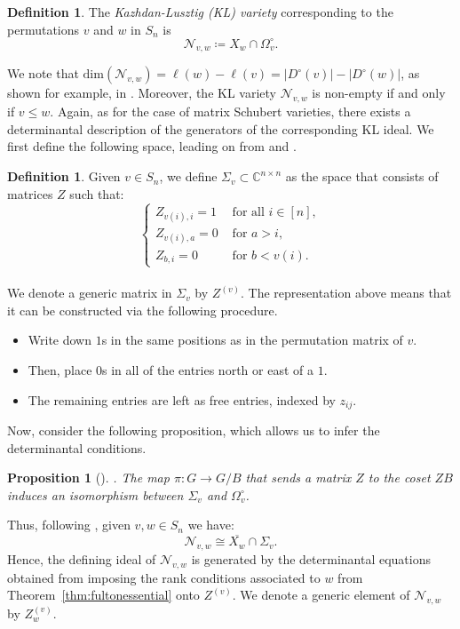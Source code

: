 \documentclass[11pt]{amsart}
\newtheorem{proposition}[theorem]{Proposition}
\theoremstyle{definition}
\theoremstyle{definition}
\newtheorem{definition}[theorem]{Definition}
\theoremstyle{definition}
\theoremstyle{definition}
\newcommand{\Xw}{\overline{X_w}}
\newcommand{\Nvw}{\mathcal{N}_{v,w}}
\newcommand{\Dc}{D^{\circ}}
\newcommand{\Zg}{Z^{(v)}_w}
\begin{document}
\begin{definition}
    The \textit{Kazhdan-Lusztig (KL) variety} corresponding to the permutations $v$ and $w$ in $S_n$ is
    $$\mathcal{N}_{v,w} \coloneqq X_w \cap \Omega_v^\circ.$$
\end{definition}
\noindent We note that $\mathrm{dim}(\Nvw) = \ell(w)-\ell(v) = |\Dc(v)| - |\Dc(w)| $, as shown for example, in \cite[Cor 3.3]{woo2008governing}. Moreover, the KL variety $\Nvw$ is non-empty if and only if $v\leq w$. Again, as for the case of matrix Schubert varieties, there exists a determinantal description of the generators of the corresponding KL ideal. We first define the following space, leading on from \cite{woo2008governing} and \cite{woo2012grobner}. 
\begin{definition}
    Given $v\in S_n$, we define $\Sigma_v\subset\mathbb{C}^{n\times n}$ as the space that consists of matrices $Z$ such that:
   $$ \begin{cases}
        Z_{v(i),i} = 1 & \text{ for all } i \in [n],\\
        Z_{v(i),a} = 0 & \text{ for } a > i,\\
        Z_{b,i} = 0 & \text{ for } b<v(i).
    \end{cases}$$\\
    We denote a generic matrix in $\Sigma_v$ by $Z^{(v)}$. The representation above means that it can be constructed via the following procedure.
    \begin{itemize}
        \item Write down $1$s in the same positions as in the permutation matrix of $v$.
        \item Then, place $0$s in all of the entries north or east of a $1$.
        \item The remaining entries are left as free entries, indexed by $z_{ij}$.
    \end{itemize}
\end{definition}

\noindent Now, consider the following proposition, which allows us to infer the determinantal conditions.
\begin{proposition}[{\cite[Chapter~10]{fulton1997algebraic}}]. The map $\pi: G \rightarrow G/B$ that sends a matrix $Z$ to the coset $ZB$ induces an isomorphism between $\Sigma_v$ and $\Omega^\circ_v$.
\end{proposition}
\noindent
Thus, following \cite{woo2008governing}, given $v,w \in S_n$ we have:
    $$\Nvw \cong \Xw \cap \Sigma_v.$$
Hence, the defining ideal of $\Nvw$ is generated by the determinantal equations obtained from imposing the rank conditions associated to $w$ from Theorem~\ref{thm:fultonessential} onto $Z^{(v)}$. We denote a generic element of $\Nvw$ by $\Zg$.
\end{document}
